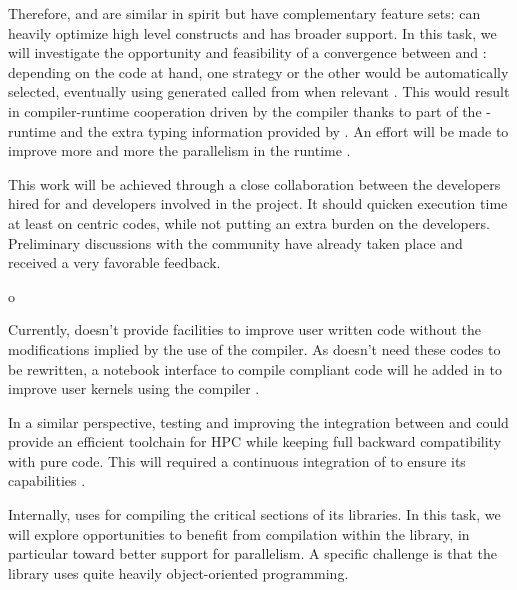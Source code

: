 \begin{workpackage}[id=hpc,wphases=36-48,
  title=High Performance Computing,
  PSRM=1, %
  LLRM=12, %
  SARM=1, %
  UKRM=1, %
  UBRM=1, %
  UJFRM=12]
\begin{tasklist}
\begin{task}[title=Pythran-Cython convergence,id=pythran-cython]
  Therefore, \Pythran and \Cython are similar in spirit but have
  complementary feature sets: \Pythran can heavily optimize high level
  \Numpy constructs and \Cython has broader \Python support. In this
  task, we will investigate the opportunity and feasibility of a
  convergence between \Cython and \Pythran: depending on the code at
  hand, one strategy or the other would be automatically selected,
  eventually using \Pythran generated called from \Cython when
  relevant . This would result in compiler-runtime
  cooperation driven by the \Cython compiler thanks to part of the
  \Pythran-runtime and the extra typing information provided by \Cython. An
  effort will be made to improve more and more the parallelism in the
  \Pythran runtime .

  This work will be achieved through a close collaboration between the \Pythran
  developers hired for \TheProject and \Cython developers involved in the \Sage
  project. It should quicken \Sage execution time at least on \Numpy centric
  codes, while not putting an extra burden on the developers.  Preliminary
  discussions with the \Cython community have already taken place and received a
  very favorable feedback.
\end{task}

\begin{task}[title=\Pythran for \Sage and \Sage Users,id=pythran-sage]o

  Currently, \Sage doesn't provide facilities to improve user written
  \Python code without the modifications implied by the use of the \Cython
  compiler. As \Pythran doesn't need these codes to be rewritten, a notebook
  interface to compile \Pythran compliant code will he added in \Sage to
  improve user kernels using the \Pythran compiler .

  In a similar perspective, testing and improving the integration between
   and \Pythran could provide an efficient toolchain for HPC
  while keeping full backward compatibility with pure \Python code. This will
  required a continuous integration of \Pythran to ensure its capabilities
  .

  Internally, \Sage uses \Cython for compiling the critical sections of
  its libraries. In this task, we will explore opportunities to
  benefit from \Pythran compilation within the \Sage library, in
  particular toward better support for parallelism. A specific
  challenge is that the \Sage library uses quite heavily
  object-oriented programming.


\end{task}
\end{tasklist}
\end{workpackage}

